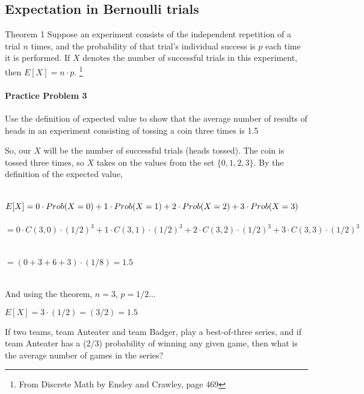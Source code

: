 {    \newpage
    
    \subsection{Expectation in Bernoulli trials}
    
        \begin{intro}{Theorem 1}
            Suppose an experiment consists of the independent repetition
            of a trial $n$ times, and the probability of that trial's
            individual success is $p$ each time it is performed.
            If $X$ denotes the number of successful trials in this experiment,
            then $E[X] = n \cdot p$.
            \footnote{From Discrete Math by Ensley and Crawley, page 469}

            \paragraph{Practice Problem 3}
            Use the definition of expected value to show that the average
            number of results of heads in an experiment
            consisting of tossing a coin three times is 1.5

            So, our $X$ will be the number of successful trials (heads tossed).
            The coin is tossed three times, so $X$ takes on the values from
            the set $\{0, 1, 2, 3\}$. By the definition of the expected value,

            ~\\
            $E[X] = \\ 0 \cdot Prob(X = 0) + 1 \cdot Prob(X = 1) + 2 \cdot Prob(X = 2)
            + 3 \cdot Prob(X = 3)$ ~\\~\\
            $= 0 \cdot C(3,0) \cdot (1/2)^{3} + 1 \cdot C(3,1) \cdot (1/2)^{3}
            + 2 \cdot C(3,2) \cdot (1/2)^{3} + 3 \cdot C(3,3) \cdot (1/2)^{3}$ ~\\~\\
            $ = (0 + 3 + 6 + 3) \cdot (1/8) = 1.5$

            ~\\
            And using the theorem, $n = 3$, $p = 1/2$...

            $E[X] = 3 \cdot (1/2) = (3/2) = 1.5$
        \end{intro}

    \newpage

    \begin{questionNOGRADE}{\thequestion}
        If two teams, team Anteater and team Badger, play a
        best-of-three series, and if team Anteater has a (2/3)
        probability of winning any given game, then what is the
        average number of games in the series?


\end{questionNOGRADE}}
